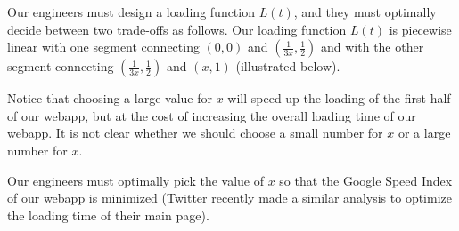 \documentclass{letter}
\begin{document}
  \begin{problem}{}
    Our engineers must design a loading function $L(t)$, and they must
    optimally decide between two trade-offs as follows. Our loading
    function $L(t)$ is piecewise linear with one segment connecting
    $(0,0)$ and $\left( \frac{1}{3x}, \frac{1}{2} \right)$ and with the
    other segment connecting $\left( \frac{1}{3x}, \frac{1}{2} \right)$
    and $(x,1)$ (illustrated below).

    \begin{center}
      
    \end{center}

    Notice that choosing a large value for $x$ will speed up the loading
    of the first half of our webapp, but at the cost of increasing
    the overall loading time of our webapp. It is not clear whether we
    should choose a small number for $x$ or a large number for $x$.

    Our engineers must optimally pick the value of $x$ so that the
    Google Speed Index of our webapp is minimized (Twitter recently
    made a similar analysis to optimize the loading time of their
    main page).


\end{problem}
\end{document}
